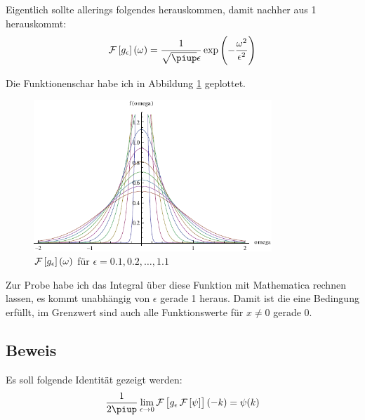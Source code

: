 Eigentlich sollte allerings folgendes herauskommen, damit nachher aus 1 herauskommt:
\[
	\fourier\sbr{g_\epsilon}(\omega)
	= \frac{1}{\sqrt{\piup} \epsilon} \exp\del{-\frac{\omega^2}{\epsilon^2}}
\]

Die Funktionenschar habe ich in Abbildung \ref{fig:Fourier} geplottet.

\begin{figure}
	\centering
	\includegraphics[width=0.8\textwidth]{Fouriertransformierte.pdf}
	\caption{$\fourier\sbr{g_\epsilon}(\omega)$ für $\epsilon = \num{0.1}, \num{0.2}, \ldots, \num{1.1}$}
	\label{fig:Fourier}
\end{figure}

Zur Probe habe ich das Integral über diese Funktion mit Mathematica rechnen
lassen, es kommt unabhängig von $\epsilon$ gerade 1 heraus. Damit ist die eine
Bedingung erfüllt, im Grenzwert sind auch alle Funktionswerte für $x \neq 0$
gerade 0.

\subsection{Beweis}

Es soll folgende Identität gezeigt werden:
\[
	\frac1{2\piup} \lim_{\epsilon\to0} \fourier\sbr{g_\epsilon \fourier\sbr\psi}(-k)
	= \psi(k)
\]

